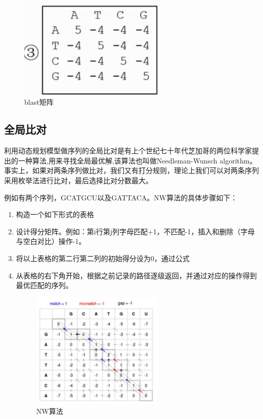 \begin{enumerate}
          \begin{figure}[htbp]
              \centering
              \includegraphics[width=7cm]{image/Alignment/blast矩阵.png}
              \caption{blast矩阵}
          \end{figure}

\end{enumerate}

\subsection {全局比对}
利用动态规划模型做序列的全局比对是有上个世纪七十年代芝加哥的两位科学家提出的一种算法,用来寻找全局最优解,该算法也叫做Needleman-Wunsch algorithm。事实上，如果对两条序列做比对，我们又有打分规则，理论上我们可以对两条序列采用枚举法进行比对，最后选择比对分数最大。

例如有两个序列，GCATGCU以及GATTACA。NW算法的具体步骤如下：

\begin{enumerate}
    \item 构造一个如下形式的表格
    \item 设计得分矩阵。例如：第i行第j列字母匹配+1，不匹配-1，插入和删除（字母与空白对比）操作-1。
    \item 将以上表格的第二行第二列的初始得分设为0，通过公式
    \item 从表格的右下角开始，根据之前记录的路径逐级返回，并通过对应的操作得到最优匹配的序列。

          \begin{figure}[htbp]
              \centering
              \includegraphics[width=0.6\textwidth]{image/Alignment/NW算法.png}
              \caption{NW算法}
          \end{figure}

\end{enumerate}


